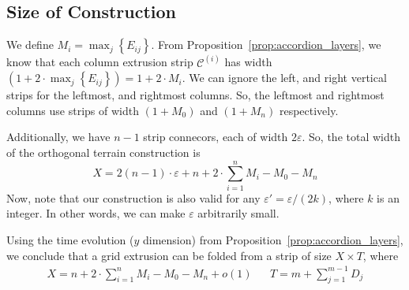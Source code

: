 \subsection{Size of Construction}
\label{sec:size}

We define $M_i = \max_j\left\{ E_{ij}\right\}$.
From Proposition~\ref{prop:accordion_layers}, we know that each column extrusion strip
$\mathcal C^{(i)}$ has width $\left( 1 + 2\cdot\max_j\left\{ E_{ij}\right\}\right) = 1+2\cdot M_i$.
We can ignore the left, and right vertical strips for the leftmost, and rightmost columns.
So, the leftmost and rightmost columns use strips of width $(1 + M_0)$ and $(1 + M_n)$ respectively.

Additionally, we have $n-1$ strip connecors, each of width $2\varepsilon$.
So, the total width of the orthogonal terrain construction is
$$X = 2(n-1)\cdot\varepsilon + n + 2\cdot\sum\limits_{i=1}^n M_i - M_0 - M_n$$
Now, note that our construction is also valid for any $\varepsilon' = \varepsilon/(2k)$, where $k$ is an integer.
In other words, we can make $\varepsilon$ arbitrarily small.

\begin{theorem}
\label{thm:grid_extrusion}
Using the time evolution ($y$ dimension) from Proposition~\ref{prop:accordion_layers},
we conclude that a grid extrusion can be folded from a strip of size $X\times T$, where
\begin{align}
X = n + 2\cdot\sum\limits_{i=1}^n M_i - M_0 - M_n + o(1) && T = m + \sum\limits^{m-1}_{j=1} D_j
\end{align}
\end{theorem}
